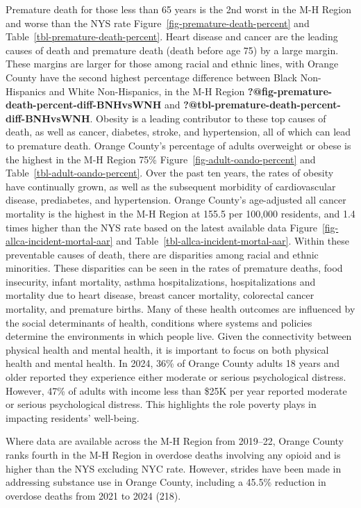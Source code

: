\documentclass[
  english,
  letterpaper,
]{report}
\begin{document}
Premature death for those less than 65 years is the 2nd worst in the M-H
Region and worse than the NYS rate
Figure~\ref{fig-premature-death-percent} and
Table~\ref{tbl-premature-death-percent}. Heart disease and cancer are
the leading causes of death and premature death (death before age 75) by
a large margin. These margins are larger for those among racial and
ethnic lines, with Orange County have the second highest percentage
difference between Black Non-Hispanics and White Non-Hispanics, in the
M-H Region \textbf{?@fig-premature-death-percent-diff-BNHvsWNH} and
\textbf{?@tbl-premature-death-percent-diff-BNHvsWNH}. Obesity is a
leading contributor to these top causes of death, as well as cancer,
diabetes, stroke, and hypertension, all of which can lead to premature
death. Orange County's percentage of adults overweight or obese is the
highest in the M-H Region 75\% Figure~\ref{fig-adult-oando-percent} and
Table~\ref{tbl-adult-oando-percent}. Over the past ten years, the rates
of obesity have continually grown, as well as the subsequent morbidity
of cardiovascular disease, prediabetes, and hypertension. Orange
County's age-adjusted all cancer mortality is the highest in the M-H
Region at 155.5 per 100,000 residents, and 1.4 times higher than the NYS
rate based on the latest available data
Figure~\ref{fig-allca-incident-mortal-aar} and
Table~\ref{tbl-allca-incident-mortal-aar}. Within these preventable
causes of death, there are disparities among racial and ethnic
minorities. These disparities can be seen in the rates of premature
deaths, food insecurity, infant mortality, asthma hospitalizations,
hospitalizations and mortality due to heart disease, breast cancer
mortality, colorectal cancer mortality, and premature births. Many of
these health outcomes are influenced by the social determinants of
health, conditions where systems and policies determine the environments
in which people live. Given the connectivity between physical health and
mental health, it is important to focus on both physical health and
mental health. In 2024, 36\% of Orange County adults 18 years and older
reported they experience either moderate or serious psychological
distress. However, 47\% of adults with income less than \$25K per year
reported moderate or serious psychological distress. This highlights the
role poverty plays in impacting residents' well-being.

Where data are available across the M-H Region from 2019--22, Orange
County ranks fourth in the M-H Region in overdose deaths involving any
opioid and is higher than the NYS excluding NYC rate. However, strides
have been made in addressing substance use in Orange County, including a
45.5\% reduction in overdose deaths from 2021 to 2024 (218).
\end{document}
